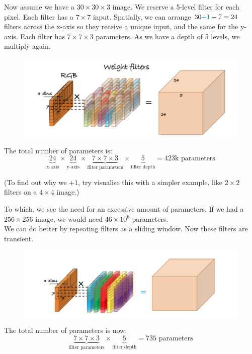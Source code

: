 Now assume we have a \(30 \times 30 \times 3\) image. We reserve a 5-level filter for each pixel. Each filter has a  \(7 \times 7\) input. Spatially, we can arrange \(30 {\color{teal}+1}-7 = 24\)  filters across the x-axis so they receive a unique input, and the same for the y-axis. Each filter has \( 7 \times 7 \times 3\) parameters. As we have a depth of 5 levels, we multiply again. \\

\begin{figure}[H]
    \centering
    \includegraphics[width=0.75\linewidth]{img/cnn_1.png}
    
    
\end{figure}

The total number of parameters is:
\[
\underbrace{24}_{\text{x-axis}} \times \underbrace{24}_{\text{y-axis}} \times \underbrace{ 7 \times 7 \times 3}_{\text{filter parameters}} \times \underbrace{5}_{\text{filter depth}} = 423\text{k parameters}
\]

(To find out why we {\color{teal}+1}, try visualise this with a simpler example, like \(2 \times 2\) filters on a \(4 \times 4\) image.)

To which, we see the need for an excessive amount of parameters. If we had a \(256 \times 256\) image, we would need \(46 \times 10^6\) parameters.\\

We can do better by repeating filters as a sliding window. Now these filters are transient.

\begin{figure}[H]
    \centering
    \includegraphics[width=0.75\linewidth]{img/cnn_2.png}
    
    
\end{figure}

The total number of parameters is now:
\[
 \underbrace{ 7 \times 7 \times 3}_{\text{filter parameters}} \times \underbrace{5}_{\text{filter depth}} = 735\text{ parameters}
\]

